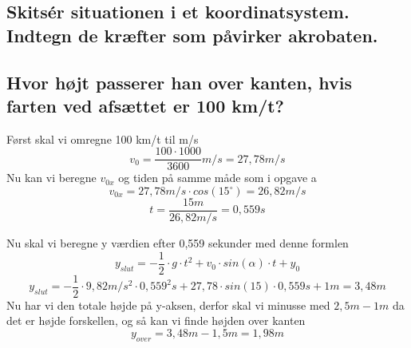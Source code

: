 \subsection{Skitsér situationen i et koordinatsystem. Indtegn de kræfter som påvirker akrobaten.}


\subsection{Hvor højt passerer han over kanten, hvis farten ved afsættet er 100 km/t?}
Først skal vi omregne 100 km/t til m/s
\begin{equation*}
    v_{0}=\frac{100\cdot 1000}{3600}m/s = 27,78m/s
\end{equation*}
Nu kan vi beregne \begin{math}v_{0x}\end{math} og tiden på samme måde som i opgave a
\begin{equation*}
    v_{0x}=27,78m/s\cdot cos(15^{\circ}) = 26,82 m/s
\end{equation*}
\begin{equation*}
    t=\frac{15m}{26,82m/s} = 0,559 s
\end{equation*}

Nu skal vi beregne y værdien efter 0,559 sekunder med denne formlen
\begin{equation*}
    y_{slut} = -\frac{1}{2}\cdot g\cdot t^{2} + v_{0}\cdot sin(\alpha)\cdot t + y_{0}
\end{equation*}
\begin{equation*}
    y_{slut} = -\frac{1}{2}\cdot 9,82m/s^{2}\cdot 0,559^{2} s + 27,78\cdot sin(15)\cdot 0,559s + 1m = 3,48m
\end{equation*}
Nu har vi den totale højde på y-aksen, derfor skal vi minusse med \begin{math}2,5m - 1m\end{math} da det er højde forskellen, og så kan vi finde højden over kanten
\begin{equation*}
    y_{over} = 3,48m - 1,5m = 1,98m
\end{equation*}
\newpage